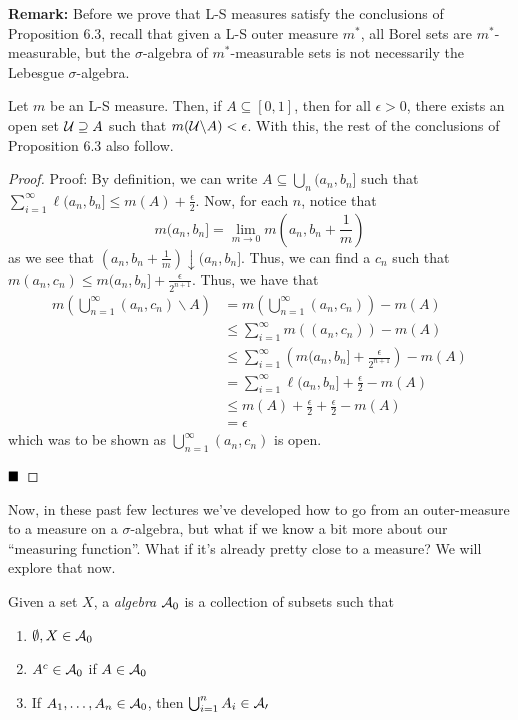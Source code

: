 
\textbf{Remark:} Before we prove that L-S measures satisfy the conclusions of Proposition 6.3, recall that given a L-S outer measure $m^{*}$, all Borel sets are $m^{*}$-measurable, but the $\sigma$-algebra of $m^{*}$-measurable sets is not necessarily the Lebesgue $\sigma$-algebra. 

\begin{lemma}
    Let $m$ be an L-S measure. Then, if $A \subseteq [0, 1]$, then for all $\epsilon > 0$, there exists an open set $\cal{U} \supseteq A$ such that $m(\cal{U}\backslash A) < \epsilon$. With this, the rest of the conclusions of Proposition 6.3 also follow. 
\end{lemma}
\begin{proof}{Proof:}
    By definition, we can write $A \subseteq \bigcup_{n} (a_n, b_n]$ such that $\sum_{i = 1}^{\infty} \ell(a_n, b_n] \leq m(A) + \frac{\epsilon}{2}$. Now, for each $n$, notice that
    \[ m(a_n, b_n] = \lim_{m \to 0} m(a_n, b_n + \frac{1}{m}) \]
    as we see that $(a_n, b_n + \frac{1}{m}) \downarrow (a_n, b_n]$. Thus, we can find a $c_n$ such that $m(a_n, c_n) \leq m(a_n, b_n] + \frac{\epsilon}{2^{n + 1}}$. Thus, we have that
    \begin{align*}
        m(\bigcup_{n = 1}^{\infty} (a_n, c_n) \backslash A) &= m(\bigcup_{n = 1}^{\infty} (a_n, c_n)) - m(A)\\
        &\leq \sum_{i = 1}^{\infty} m((a_n, c_n)) - m(A)\\
        &\leq \sum_{i = 1}^{\infty} \left(m(a_n, b_n] + \frac{\epsilon}{2^{n + 1}}\right) - m(A)\\
        &= \sum_{i = 1}^{\infty} \ell(a_n, b_n] + \frac{\epsilon}{2} - m(A)\\
        &\leq m(A) + \frac{\epsilon}{2} + \frac{\epsilon}{2} - m(A)\\
        &= \epsilon
    \end{align*}
    which was to be shown as $\bigcup_{n = 1}^{\infty} (a_n, c_n)$ is open. 

    $\qed$
\end{proof}

Now, in these past few lectures we've developed how to go from an outer-measure to a measure on a $\sigma$-algebra, but what if we know a bit more about our ``measuring function''. What if it's already pretty close to a measure? We will explore that now.

\begin{definition}
   Given a set $X$, a \emph{algebra} $\cal{A}_0$ is a collection of subsets such that
   \begin{enumerate}
       \item $\emptyset, X \in \cal{A}_0$
       \item $A^{c} \in \cal{A}_{0}$ if $A \in \cal{A}_{0}$
       \item If $A_1, \ldots, A_n \in \cal{A}_0$, then $\bigcup_{i = 1}^{n} A_i \in \cal{A_0}$
   \end{enumerate} 
\end{definition}

